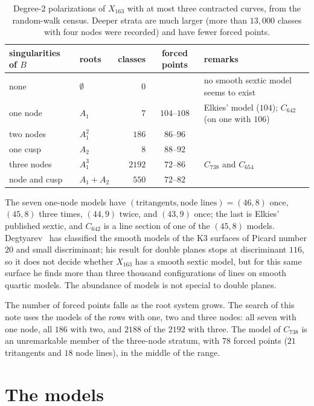 \documentclass[11pt]{article}
\newcommand{\X}{X}
\theoremstyle{remark}
\begin{document}
\begin{table}[h]
\centering\small
\begin{tabular}{llrcl}
\toprule
singularities of $B$ & roots & classes & forced points & remarks\\
\midrule
none & $\emptyset$ & $0$ & & no smooth sextic model seems to exist\\
one node & $A_1$ & $7$ & $104$--$108$ & Elkies' model ($104$); $C_{642}$ (on one with $106$)\\
two nodes & $A_1^2$ & $186$ & $86$--$96$ & \\
one cusp & $A_2$ & $8$ & $88$--$92$ & \\
three nodes & $A_1^3$ & $2192$ & $72$--$86$ & $C_{738}$ and $C_{654}$\\
node and cusp & $A_1+A_2$ & $550$ & $72$--$82$ & \\
\bottomrule
\end{tabular}
\caption{Degree-$2$ polarizations of $\X_{163}$ with at most three contracted curves, from the random-walk census.
Deeper strata are much larger (more than $13{,}000$ classes with four nodes were recorded) and have fewer forced points.}
\label{tab:strata}
\end{table}

The seven one-node models have $(\text{tritangents},\text{node lines})=(46,8)$ once, $(45,8)$ three times, $(44,9)$ twice, and
$(43,9)$ once; the last is Elkies' published sextic, and $C_{642}$ is a line section of one of the $(45,8)$ models.
Degtyarev~\cite{Degtyarev} has classified the smooth models of the K3 surfaces of Picard number $20$ and small discriminant;
his result for double planes stops at discriminant $116$, so it does not decide whether $\X_{163}$ has a smooth sextic model, but
for this same surface he finds more than three thousand configurations of lines on smooth quartic models.  The abundance of models
is not special to double planes.

The number of forced points falls as the root system grows.  The search of this note uses the models of the rows with one, two
and three nodes: all seven with one node, all $186$ with two, and $2188$ of the $2192$ with three.  The model of $C_{738}$ is an
unremarkable member of the three-node stratum, with $78$ forced points ($21$ tritangents and $18$ node lines), in the middle of
the range.

\section{The models}\label{sec:models}
\end{document}
